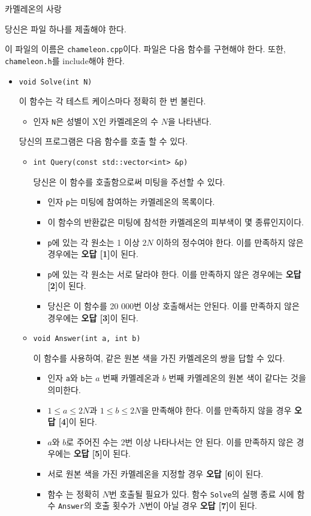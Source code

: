 \begin{problem}{카멜레온의 사랑}
	\Specification
	
	당신은 파일 하나를 제출해야 한다.
	
	이 파일의 이름은 \texttt{chameleon.cpp}이다. 파일은 다음 함수를 구현해야 한다. 또한, \texttt{chameleon.h}를 include해야 한다.
	
	\begin{itemize}
		\item \texttt{void Solve(int N)}
		
		이 함수는 각 테스트 케이스마다 정확히 한 번 불린다.
		\begin{itemize}
			\item 인자 \texttt{N}은 성별이 X인 카멜레온의 수 $N$을 나타낸다.
		\end{itemize}
		
		당신의 프로그램은 다음 함수를 호출 할 수 있다.
		\begin{itemize}
			\item \texttt{int Query(const std::vector<int> \&p)}
			
			당신은 이 함수를 호출함으로써 미팅을 주선할 수 있다.
			
			\begin{itemize}
				\item 인자 \texttt{p}는 미팅에 참여하는 카멜레온의 목록이다.
				\item 이 함수의 반환값은 미팅에 참석한 카멜레온의 피부색이 몇 종류인지이다.
				\item \texttt{p}에 있는 각 원소는 1 이상 $2N$ 이하의 정수여야 한다. 이를 만족하지 않은 경우에는 \textbf{오답 [1]}이 된다.
				\item \texttt{p}에 있는 각 원소는 서로 달라야 한다. 이를 만족하지 않은 경우에는 \textbf{오답 [2]}이 된다.
				\item 당신은 이 함수를 20 000번 이상 호출해서는 안된다. 이를 만족하지 않은 경우에는 \textbf{오답 [3]}이 된다.
			\end{itemize}
			
			\item \texttt{void Answer(int a, int b)}
			
			이 함수를 사용하여, 같은 원본 색을 가진 카멜레온의 쌍을 답할 수 있다.
			
			\begin{itemize}
				\item 인자 \texttt{a}와 \texttt{b}는 $a$ 번째 카멜레온과 $b$ 번째 카멜레온의 원본 색이 같다는 것을 의미한다.
				\item $1 \le a \le 2N$과 $1 \le b \le 2N$을 만족해야 한다. 이를 만족하지 않을 경우 \textbf{오답 [4]}이 된다.
				\item $a$와 $b$로 주어진 수는 2번 이상 나타나서는 안 된다. 이를 만족하지 않은 경우에는 \textbf{오답 [5]}이 된다.
				\item 서로 원본 색을 가진 카멜레온을 지정할 경우 \textbf{오답 [6]}이 된다.
				\item 
				함수 는 정확히 $N$번 호출될 필요가 있다. 함수 \texttt{Solve}의 실행 종료 시에 함수 \texttt{Answer}의 호출 횟수가 $N$번이 아닐 경우 \textbf{오답 [7]}이 된다.
			\end{itemize}
			

\end{itemize}
\end{itemize}
\end{problem}
